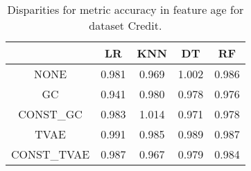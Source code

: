 \begin{table}
\caption{Disparities for metric accuracy in feature age for dataset Credit.}
\label{tab:disp-CREDIT-age-accuracy}
\begin{tabular}{ccccc}
\toprule
 & LR & KNN & DT & RF \\
\midrule
NONE & 0.981 & 0.969 & 1.002 & 0.986 \\
GC & 0.941 & 0.980 & 0.978 & 0.976 \\
CONST\_GC & 0.983 & 1.014 & 0.971 & 0.978 \\
TVAE & 0.991 & 0.985 & 0.989 & 0.987 \\
CONST\_TVAE & 0.987 & 0.967 & 0.979 & 0.984 \\
\bottomrule
\end{tabular}
\end{table}

